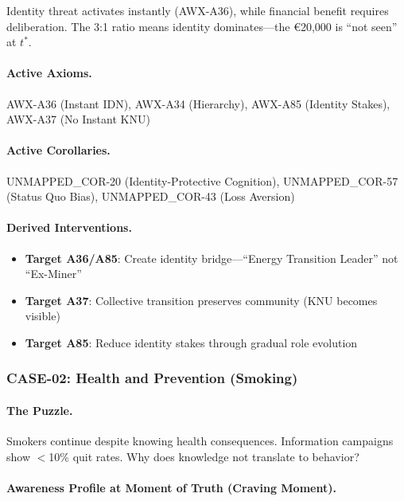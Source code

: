 Identity threat activates instantly (AWX-A36), while financial benefit requires deliberation. The 3:1 ratio means identity dominates---the \euro{20,000} is ``not seen'' at $t^*$.

\paragraph{Active Axioms.} AWX-A36 (Instant IDN), AWX-A34 (Hierarchy), AWX-A85 (Identity Stakes), AWX-A37 (No Instant KNU)

\paragraph{Active Corollaries.} UNMAPPED_COR-20 (Identity-Protective Cognition), UNMAPPED_COR-57 (Status Quo Bias), UNMAPPED_COR-43 (Loss Aversion)

\paragraph{Derived Interventions.}
\begin{itemize}
    \item \textbf{Target A36/A85}: Create identity bridge---``Energy Transition Leader'' not ``Ex-Miner''
    \item \textbf{Target A37}: Collective transition preserves community (KNU becomes visible)
    \item \textbf{Target A85}: Reduce identity stakes through gradual role evolution
\end{itemize}


\subsubsection{CASE-02: Health and Prevention (Smoking)}

\paragraph{The Puzzle.}
Smokers continue despite knowing health consequences. Information campaigns show $<$10\% quit rates. Why does knowledge not translate to behavior?

\paragraph{Awareness Profile at Moment of Truth (Craving Moment).}

